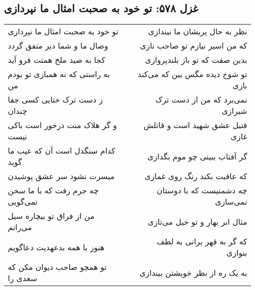 \begin{center}
\section*{غزل ۵۷۸: تو خود به صحبت امثال ما نپردازی}
\label{sec:578}
\begin{longtable}{l p{0.5cm} r}
تو خود به صحبت امثال ما نپردازی
&&
نظر به حال پریشان ما نیندازی
\\
وصال ما و شما دیر متفق گردد
&&
که من اسیر نیازم تو صاحب نازی
\\
کجا به صید ملخ همتت فرو آید
&&
بدین صفت که تو باز بلندپروازی
\\
به راستی که نه همبازی تو بودم من
&&
تو شوخ دیده مگس بین که می‌کند بازی
\\
ز دست ترک ختایی کسی جفا چندان
&&
نمی‌برد که من از دست ترک شیرازی
\\
و گر هلاک منت درخور است باکی نیست
&&
قتیل عشق شهید است و قاتلش غازی
\\
کدام سنگدل است آن که عیب ما گوید
&&
گر آفتاب ببینی چو موم بگدازی
\\
میسرت نشود سر عشق پوشیدن
&&
که عاقبت بکند رنگ روی غمازی
\\
چه جرم رفت که با ما سخن نمی‌گویی
&&
چه دشمنیست که با دوستان نمی‌سازی
\\
من از فراق تو بیچاره سیل می‌رانم
&&
مثال ابر بهار و تو خیل می‌تازی
\\
هنوز با همه بدعهدیت دعاگویم
&&
که گر به قهر برانی به لطف بنوازی
\\
تو همچو صاحب دیوان مکن که سعدی را
&&
به یک ره از نظر خویشتن بیندازی
\\
\end{longtable}
\end{center}
